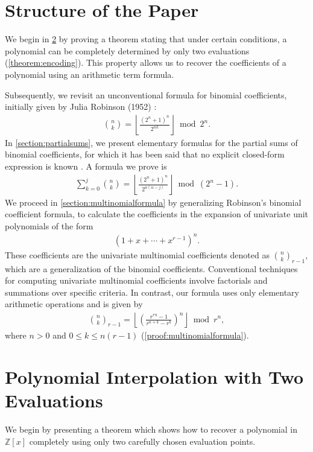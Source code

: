 \documentclass{article}
\theoremstyle{plain}
\newcommand{\floor}[1]{\left\lfloor #1 \right\rfloor}
\begin{document}
\section{Structure of the Paper}
We begin in \cref{section:interpolation} by proving a theorem stating that under certain conditions, a polynomial can be completely determined by only two evaluations (\cref{theorem:encoding}). This property allows us to recover the coefficients of a polynomial using an arithmetic term formula.

Subsequently, we revisit an unconventional formula for binomial coefficients, initially given by Julia Robinson (1952) \cite{robinson1952arithmetic}:
\begin{align*}
\binom{n}{k} = \left\lfloor\frac{(2^n+1)^n}{2^{n k}}\right\rfloor \bmod{2^{n}} .
\end{align*}
In \cref{section:partialsums}, we present elementary formulas for the partial sums of binomial coefficients, for which it has been said that no explicit closed-form expression is known \cite{boardman2004eggdropnumbers, wikipedia2024binomialcoefficient}. A formula we prove is
\begin{align*}
\sum_{k=0}^{j} \binom{n}{k}
= \floor{\frac{(2^n+1)^n}{2^{n(n-j)}}} \bmod (2^n-1) .
\end{align*}
We proceed in \cref{section:multinomialformula} by generalizing Robinson's binomial coefficient formula, to calculate the coefficients in the expansion of univariate unit polynomials of the form
\begin{align*}
 [x^k](1 + x + \cdots + x^{r-1})^n .
\end{align*}
These coefficients are the univariate multinomial coefficients denoted as $\binom{n}{k}_{r-1}$, which are a generalization of the binomial coefficients. Conventional techniques for computing univariate multinomial coefficients involve factorials and summations over specific criteria. In contrast, our formula uses only elementary arithmetic operations and is given by
\begin{align*}
    \binom{n}{k}_{r-1} = \left\lfloor\left(\frac{r^{rn} - 1}{r^{n+k} - r^k}\right)^n\right\rfloor \bmod r^n ,
\end{align*}
where $n > 0$ and $0 \leq k \leq n (r-1)$ (\cref{proof:multinomialformula}).

\section{Polynomial Interpolation with Two Evaluations} \label{section:interpolation}
We begin by presenting a theorem which shows how to recover a polynomial in $\mathbb{Z}[x]$ completely using only two carefully chosen evaluation points.
\end{document}
